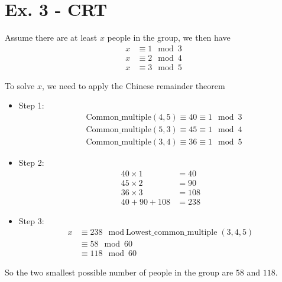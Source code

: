 \documentclass[11pt,a4paper]{article}
\begin{document}
\section*{Ex. 3 - CRT}
\par Assume there are at least $x$ people in the group, we then have
	\begin{align*}
		x &\equiv 1 \mod 3 \\
		x &\equiv 2 \mod 4 \\
		x &\equiv 3 \mod 5
	\end{align*}
\par To solve $x$, we need to apply the Chinese remainder theorem
	\begin{itemize}
		\item Step 1:
			\begin{align*}
				&\mbox{Common\_multiple}(4, 5) \equiv 40 \equiv 1 \mod 3 \\
				&\mbox{Common\_multiple}(5, 3) \equiv 45 \equiv 1 \mod 4 \\
				&\mbox{Common\_multiple}(3, 4) \equiv 36 \equiv 1 \mod 5
			\end{align*}

		\item Step 2:
			\begin{align*}
				40 \times 1 &= 40 \\
				45 \times 2 &= 90 \\
				36 \times 3 &= 108 \\
				40 + 90 + 108 &= 238
			\end{align*}

		\item Step 3:
			\begin{align*}
				x &\equiv 238 \mod \mbox{Lowest\_common\_multiple} (3, 4 , 5) \\
				&\equiv 58 \mod 60 \\
				&\equiv 118 \mod 60
			\end{align*}
	\end{itemize}
\par So the two smallest possible number of people in the group are $58$ and $118$.
\end{document}
